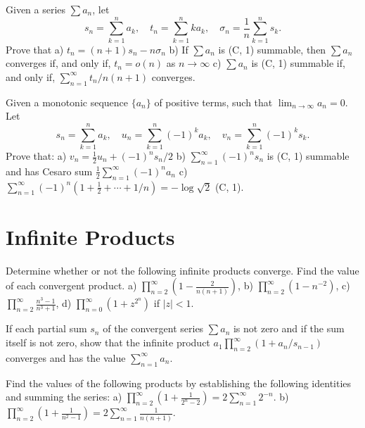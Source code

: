     \begin{problembox}
    Given a series \(\sum a_n\), let
    \[s_n = \sum_{k=1}^{n} a_k, \quad t_n = \sum_{k=1}^{n} k a_k, \quad \sigma_n = \frac{1}{n} \sum_{k=1}^{n} s_k.\]
    Prove that
    a) \(t_n = (n + 1)s_n - n\sigma_n\)
    b) If \(\sum a_n\) is (C, 1) summable, then \(\sum a_n\) converges if, and only if, \(t_n = o(n)\) as \(n \to \infty\)
    c) \(\sum a_n\) is (C, 1) summable if, and only if, \(\sum_{n=1}^{\infty} t_n / n(n + 1)\) converges.
    \end{problembox}
    
    \begin{problembox}
    Given a monotonic sequence \(\{a_n\}\) of positive terms, such that \(\lim_{n \to \infty} a_n = 0\). Let
    \[s_n = \sum_{k=1}^{n} a_k, \quad u_n = \sum_{k=1}^{n} (-1)^k a_k, \quad v_n = \sum_{k=1}^{n} (-1)^k s_k.\]
    Prove that:
    a) \(v_n = \frac{1}{2} u_n + (-1)^n s_n / 2\)
    b) \(\sum_{n=1}^{\infty} (-1)^n s_n\) is (C, 1) summable and has Cesaro sum \(\frac{1}{2} \sum_{n=1}^{\infty} (-1)^n a_n\)
    c) \(\sum_{n=1}^{\infty} (-1)^n (1 + \frac{1}{2} + \cdots + 1/n) = -\log \sqrt{2}\) (C, 1).
    \end{problembox}

\section{Infinite Products}

\begin{problembox}
    Determine whether or not the following infinite products converge. Find the value of each convergent product.
    a) \(\prod_{n=2}^{\infty} \left( 1 - \frac{2}{n(n+1)} \right)\), 
    b) \(\prod_{n=2}^{\infty} (1 - n^{-2})\),
    c) \(\prod_{n=2}^{\infty} \frac{n^3 - 1}{n^3 + 1}\), 
    d) \(\prod_{n=0}^{\infty} (1 + z^{2^n})\) if \(|z| < 1\).
    \end{problembox}
    
    \begin{problembox}
    If each partial sum \(s_n\) of the convergent series \(\sum a_n\) is not zero and if the sum itself is not zero, show that the infinite product \(a_1 \prod_{n=2}^{\infty} (1 + a_n / s_{n-1})\) converges and has the value \(\sum_{n=1}^{\infty} a_n\).
    \end{problembox}
    
    \begin{problembox}
    Find the values of the following products by establishing the following identities and summing the series:
    a) \(\prod_{n=2}^{\infty} \left( 1 + \frac{1}{2^n - 2} \right) = 2 \sum_{n=1}^{\infty} 2^{-n}\).
    b) \(\prod_{n=2}^{\infty} \left( 1 + \frac{1}{n^2 - 1} \right) = 2 \sum_{n=1}^{\infty} \frac{1}{n(n+1)}\).
    \end{problembox}
    
